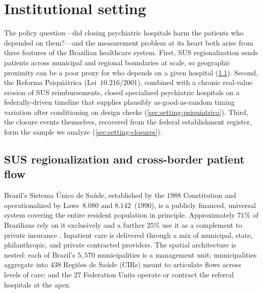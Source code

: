 \section{Institutional setting}
\label{sec:setting}

The policy question---did closing psychiatric hospitals harm the
patients who depended on them?---and the measurement problem at its
heart both arise from three features of the Brazilian healthcare system.
First, SUS regionalization sends patients across municipal and regional
boundaries at scale, so geographic proximity can be a poor proxy for who
depends on a given hospital (\ref{sec:setting-sus}). Second, the Reforma
Psiquiátrica (Lei~$10.216$/$2001$), combined with a chronic real-value
erosion of SUS reimbursements, closed specialized psychiatric hospitals
on a federally-driven timeline that supplies plausibly as-good-as-random
timing variation after conditioning on design checks
(\ref{sec:setting-psiquiatrica}). Third, the closure events themselves,
recovered from the federal establishment register, form the sample we
analyze (\ref{sec:setting-closures}).

\subsection{SUS regionalization and cross-border patient flow}
\label{sec:setting-sus}

Brazil's Sistema Único de Saúde, established by the $1988$ Constitution
and operationalized by Laws~$8.080$ and $8.142$~($1990$), is a publicly
financed, universal system covering the entire resident population in
principle. Approximately $71\%$ of Brazilians rely on it exclusively and
a further $25\%$ use it as a complement to private insurance
\citep{macinkoHarris2015}. Inpatient care is delivered through a mix of
municipal, state, philanthropic, and private contracted providers. The
spatial architecture is nested: each of Brazil's $5{,}570$
municipalities is a management unit; municipalities aggregate into $438$
Regiões de Saúde (CIRs) meant to articulate flows across levels of care;
and the $27$ Federation Units operate or contract the referral hospitals
at the apex.

